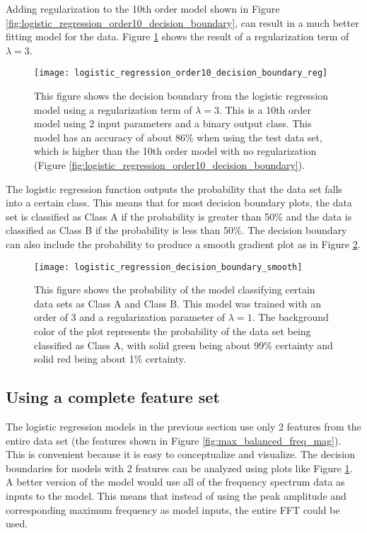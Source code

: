 Adding regularization to the 10th order model shown in Figure \ref{fig:logistic_regression_order10_decision_boundary}, can result in a much better fitting model for the data.  Figure \ref{fig:logistic_regression_order10_decision_boundary_reg} shows the result of a regularization term of $\lambda=3$.

\begin{figure}
	\centering
	\texttt{[image: logistic\_regression\_order10\_decision\_boundary\_reg]}
	\decoRule
	\caption{This figure shows the decision boundary from the logistic regression model using a regularization term of $\lambda=3$.  This is a 10th order model using 2 input parameters and a binary output class.  This model has an accuracy of about 86\% when using the test data set, which is higher than the 10th order model with no regularization (Figure \ref{fig:logistic_regression_order10_decision_boundary}).}
	\label{fig:logistic_regression_order10_decision_boundary_reg}
\end{figure}

The logistic regression function outputs the probability that the data set falls into a certain class.  This means that for most decision boundary plots, the data set is classified as Class A if the probability is greater than 50\% and the data is classified as Class B if the probability is less than 50\%.  The decision boundary can also include the probability to produce a smooth gradient plot as in Figure \ref{fig:logistic_regression_decision_boundary_smooth}.

\begin{figure}
	\centering
	\texttt{[image: logistic\_regression\_decision\_boundary\_smooth]}
	\decoRule
	\caption{This figure shows the probability of the model classifying certain data sets as Class A and Class B.  This model was trained with an order of 3 and a regularization parameter of $\lambda=1$.  The background color of the plot represents the probability of the data set being classified as Class A, with solid green being about 99\% certainty and solid red being about 1\% certainty.}
	\label{fig:logistic_regression_decision_boundary_smooth}
\end{figure}



\subsection{Using a complete feature set}
The logistic regression models in the previous section use only 2 features from the entire data set (the features shown in Figure \ref{fig:max_balanced_freq_mag}).  This is convenient because it is easy to conceptualize and visualize.  The decision boundaries for models with 2 features can be analyzed using plots like Figure \ref{fig:logistic_regression_order10_decision_boundary_reg}.  A better version of the model would use all of the frequency spectrum data as inputs to the model.  This means that instead of using the peak amplitude and corresponding maximum frequency as model inputs, the entire FFT could be used.

